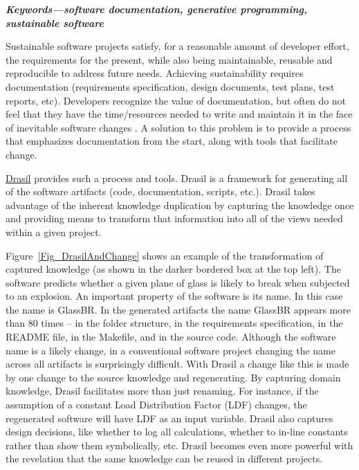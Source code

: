 \documentclass[onecolumn]{IEEEtran}
\begin{document}
\begin{multicols}{2}
  
  
\textbf{\emph{Keywords---software documentation, generative programming, sustainable
    software}}
\medskip

Sustainable software projects satisfy, for a reasonable amount of developer
effort, the requirements for the present, while also being maintainable,
reusable and reproducible to address future needs.  Achieving sustainability
requires documentation (requirements specification, design documents, test
plans, test reports, etc).  Developers recognize the value of documentation, but
often do not feel that they have the time/resources needed to write and maintain
it in the face of inevitable software changes
\cite{SmithJegatheesanAndKelly2016}.  A solution to this problem is to provide a
process that emphasizes documentation from the start, along with tools that
facilitate change.

\href{https://github.com/JacquesCarette/Drasil} {Drasil} provides such a process
and tools.  Drasil is a framework for generating all of the software artifacts
(code, documentation, scripts, etc.).  Drasil takes advantage of the inherent
knowledge duplication by capturing the knowledge once and providing means to
transform that information into all of the views needed within a given project.

Figure~\ref{Fig_DrasilAndChange} shows an example of the transformation of
captured knowledge (as shown in the darker bordered box at the top left).  The
software predicts whether a given plane of glass is likely to break when
subjected to an explosion.  An important property of the software is its name.
In this case the name is GlassBR.  In the generated artifacts the name GlassBR
appears more than 80 times -- in the folder structure, in the requirements
specification, in the README file, in the Makefile, and in the source code.
Although the software name is a likely change, in a conventional software
project changing the name across all artifacts is surprisingly difficult.  With
Drasil a change like this is made by one change to the source knowledge and
regenerating.  By capturing domain knowledge, Drasil facilitates more than just
renaming.  For instance, if the assumption of a constant Load Distribution
Factor (LDF) changes, the regenerated software will have LDF as an input
variable.  Drasil also captures design decisions, like whether to log all
calculations, whether to in-line constants rather than show them symbolically,
etc. Drasil becomes even more powerful with the revelation that the same
knowledge can be reused in different projects.


\end{multicols}
\end{document}
